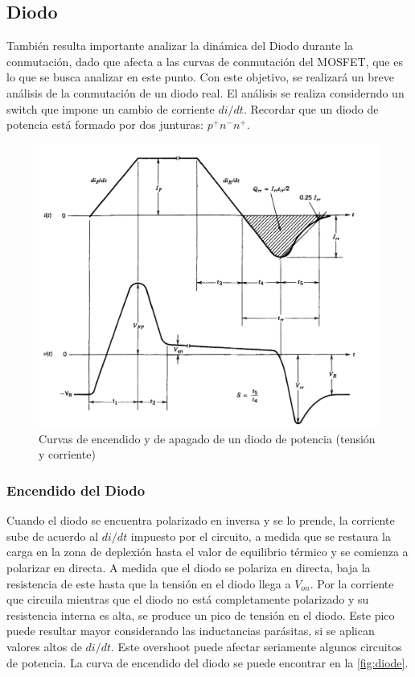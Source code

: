 \documentclass[e4_tp1_main.tex]{subfiles}
\begin{document}
\subsection{Diodo}
También resulta importante analizar la dinámica del Diodo durante la conmutación, dado que afecta a las curvas de conmutación del MOSFET, que es lo que se busca analizar en este punto. Con este objetivo, se realizará un breve análisis de la conmutación de un diodo real. El análisis se realiza considerndo un switch que impone un cambio de corriente $di/dt$. Recordar que un diodo de potencia está formado por dos junturas: $p^+n^-n^+$.

\begin{figure}[H]
  \centering
  \includegraphics[width=\linewidth/2]{images/ej1/diode.png}
  \caption{Curvas de encendido y de apagado de un diodo de potencia (tensión y corriente)}
  \label{fig:diode}
\end{figure}

\subsubsection{Encendido del Diodo}
Cuando el diodo se encuentra polarizado en inversa y se lo prende, la corriente sube de acuerdo al $di/dt$ impuesto por el circuito, a medida que se restaura la carga en la zona de deplexión hasta el valor de equilibrio térmico y se comienza a polarizar en directa. A medida que el diodo se polariza en directa, baja la resistencia de este hasta que la tensión en el diodo llega a $V_{on}$. Por la corriente que circuila mientras que el diodo no está completamente polarizado y su resistencia interna es alta, se produce un pico de tensión en el diodo. Este pico puede resultar mayor considerando las inductancias parásitas, si se aplican valores altos de $di/dt$. Este overshoot puede afectar seriamente algunos circuitos de potencia. La curva de encendido del diodo se puede encontrar en la \autoref{fig:diode}.
\end{document}
